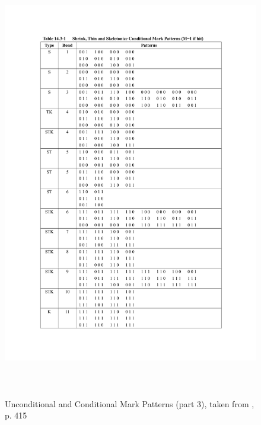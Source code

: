 \documentclass{article}
\begin{document}
\begin{figure}[hb]
 \includegraphics[page=3,height=19cm]{images/patternTables.pdf}
 \caption{Unconditional and Conditional Mark Patterns (part 3), taken from \cite{Pratt:2001:DIP:516234}, p. 415}
 \label{fig:markpatterns3}
\end{figure}




\end{document}
